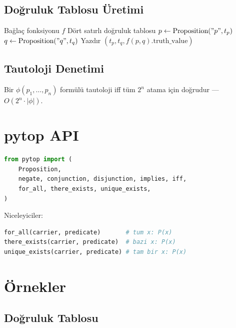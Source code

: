 \subsection{Doğruluk Tablosu Üretimi}

\begin{algorithm}
\caption{Doğruluk Tablosu (İki Değişkenli)}
\label{alg:truth_table}
\begin{algorithmic}[1]
\Require Bağlaç fonksiyonu $f$
\Ensure Dört satırlı doğruluk tablosu
  \State $p \leftarrow \text{Proposition}("p", t_p)$
  \State $q \leftarrow \text{Proposition}("q", t_q)$
  \State Yazdır $(t_p, t_q, f(p, q).\text{truth\_value})$
\EndFor
\end{algorithmic}
\end{algorithm}

\subsection{Tautoloji Denetimi}

Bir $\phi(p_1,\ldots,p_n)$ formülü tautoloji iff tüm $2^n$ atama için
doğrudur — $O(2^n \cdot |\phi|)$.

\section{pytop API}
\label{sec:logic_api}

\begin{lstlisting}[language=Python, caption={logic modülü importu}]
from pytop import (
    Proposition,
    negate, conjunction, disjunction, implies, iff,
    for_all, there_exists, unique_exists,
)
\end{lstlisting}

Niceleyiciler:
\begin{lstlisting}[language=Python]
for_all(carrier, predicate)       # tum x: P(x)
there_exists(carrier, predicate)  # bazi x: P(x)
unique_exists(carrier, predicate) # tam bir x: P(x)
\end{lstlisting}

\section{Örnekler}
\label{sec:logic_examples}

\subsection{Doğruluk Tablosu}

